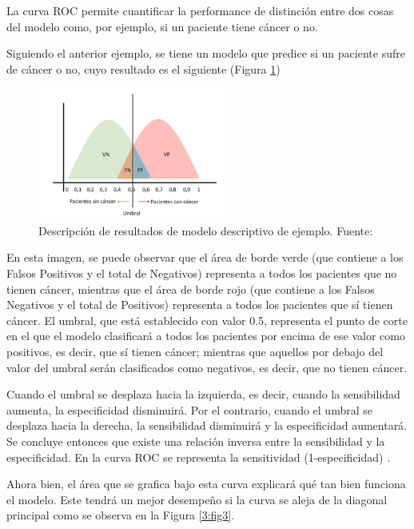 \begin{itemize}
	La curva ROC permite cuantificar la performance de distinción entre dos cosas del modelo como, por ejemplo, si un paciente tiene cáncer o no.
	
	Siguiendo el anterior ejemplo, se tiene un modelo que predice si un paciente sufre de cáncer o no, cuyo resultado es el siguiente (Figura \ref{3:fig2})
	
	\begin{figure}[htbp]
		\begin{center}
			\includegraphics[width=0.55\textwidth]{3/figures/auc_example.jpg}
			\caption{Descripción de resultados de modelo descriptivo de ejemplo. Fuente: \cite{gl_gonzalez2019auc}}
			\label{3:fig2}
		\end{center}
	\end{figure}
	
	En esta imagen, se puede observar que el área de borde verde (que contiene a los Falsos Positivos y el total de Negativos) representa a todos los pacientes que no tienen cáncer, mientras que el área de borde rojo (que contiene a los Falsos Negativos y el total de Positivos) representa a todos los pacientes que sí tienen cáncer. El umbral, que está establecido con valor 0.5, representa el punto de corte en el que el modelo clasificará a todos los pacientes por encima de ese valor como positivos, es decir, que sí tienen cáncer; mientras que aquellos por debajo del valor del umbral serán clasificados como negativos, es decir, que no tienen cáncer.
	
	Cuando el umbral se desplaza hacia la izquierda, es decir, cuando la sensibilidad aumenta, la especificidad disminuirá. Por el contrario, cuando el umbral se desplaza hacia la derecha, la sensibilidad disminuirá y la especificidad aumentará. Se concluye entonces que existe una relación inversa entre la sensibilidad y la especificidad. En la curva ROC se representa la sensitividad (1-especificidad) \parencite{gl_gonzalez2019auc}.
	
	Ahora bien, el área que se grafica bajo esta curva explicará qué tan bien funciona el modelo. Este tendrá un mejor desempeño si la curva se aleja de la diagonal principal como se observa en la Figura \ref{3:fig3}.
	

\end{itemize}
